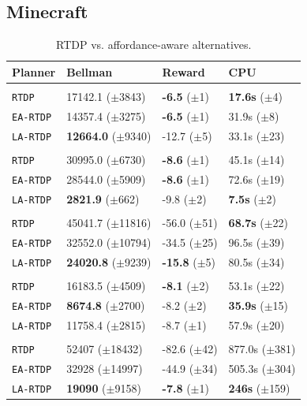 \documentclass[letterpaper]{article}
\newcommand{\ra}[1]{\renewcommand{\arraystretch}{#1}} %
\begin{document}
\subsection{Minecraft}

\begin{table}
\ra{1.15}
\small
\begin{tabular}{@{}llll@{}}\toprule
Planner & Bellman & Reward & CPU \\ \midrule
&\hspace{-10mm}{\it Mining Task} \\
\texttt{RTDP} & 17142.1 ($\pm$3843) 		& {\bf -6.5} ($\pm$1)  & {\bf 17.6s}   ($\pm$4) \\
\texttt{EA-RTDP} 	& 14357.4 ($\pm$3275) 		& {\bf -6.5}   ($\pm$1) & 31.9s   ($\pm$8) \\
\texttt{LA-RTDP} 	& {\bf 12664.0} ($\pm$9340) 	& -12.7 ($\pm$5) & 33.1s   ($\pm$23) \\\hline
&\hspace{-10mm}{\it Smelting Task} \\
\texttt{RTDP} 	& 30995.0 ($\pm$6730) 		& {\bf -8.6}   ($\pm$1) & 45.1s   ($\pm$14) \\
\texttt{EA-RTDP} 	& 28544.0 ($\pm$5909) 		& {\bf -8.6}   ($\pm$1) & 72.6s   ($\pm$19) \\ 
\texttt{LA-RTDP} 	& {\bf 2821.9} 	 ($\pm$662) 	& -9.8   ($\pm$2) & {\bf 7.5s}  ($\pm$2) \\ \hline
&\hspace{-10mm}{\it Wall Traversal Task} \\
\texttt{RTDP} & 45041.7 ($\pm$11816) 		& -56.0   ($\pm$51) & {\bf 68.7s}   ($\pm$22) \\
\texttt{EA-RTDP} 	& 32552.0 ($\pm$10794) 		& -34.5   ($\pm$25) & 96.5s   ($\pm$39) \\ 
\texttt{LA-RTDP} 	& {\bf 24020.8} ($\pm$9239) 	& {\bf -15.8}   ($\pm$5) & 80.5s   ($\pm$34) \\ \hline
&\hspace{-10mm}{\it Trench Traversal Task} \\
\texttt{RTDP}  	& 16183.5 ($\pm$4509) 		& {\bf -8.1}   ($\pm$2) & 53.1s   ($\pm$22) \\
\texttt{EA-RTDP} 	& {\bf 8674.8} 	($\pm$2700) 	& -8.2   ($\pm$2) & {\bf 35.9s}   ($\pm$15) \\ 
\texttt{LA-RTDP} 	& 11758.4 ($\pm$2815) 		& -8.7   ($\pm$1) & 57.9s   ($\pm$20) \\ \hline
&\hspace{-10mm}{\it Plane Traversal Task} \\
\texttt{RTDP} & 52407 ($\pm$18432) 		& -82.6   ($\pm$42) & 877.0s   ($\pm$381) \\
\texttt{EA-RTDP} 	& 32928 ($\pm$14997) 		& -44.9   ($\pm$34) & 505.3s   ($\pm$304) \\
\texttt{LA-RTDP} 	& {\bf 19090} 	 ($\pm$9158) 	& {\bf-7.8}   ($\pm$1) & {\bf 246s}  ($\pm$159) \\
\bottomrule
\end{tabular}
\caption{RTDP vs. affordance-aware alternatives.}
\label{table:minecraft_results}
\end{table}
\end{document}
